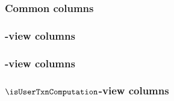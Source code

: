 \subsubsection{Common                         columns \lispTodo{}}    \label{user txn data: generalities: columns: common}          
\subsubsection{\hubMod              {}-view   columns \lispTodo{}}    \label{user txn data: generalities: columns: hub view}        
\subsubsection{\rlpTxnMod           {}-view   columns \lispTodo{}}    \label{user txn data: generalities: columns: rlp view}        
\subsubsection{$\isUserTxnComputation$-view   columns \lispTodo{}}    \label{user txn data: generalities: columns: computation}     
